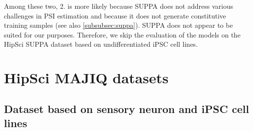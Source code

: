 Among these two, 2. is more likely because SUPPA does not address various challenges in PSI estimation and because it does not generate constitutive training samples (see also \ref{subsubsec:suppa}). SUPPA does not appear to be suited for our purposes. Therefore, we skip the evaluation of the models on the HipSci SUPPA dataset based on undifferentiated iPSC cell lines.





\section{HipSci MAJIQ datasets} \label{subsec:majiq}

\subsection{Dataset based on sensory neuron and iPSC cell lines}\label{sec:hipsci_neuron_majiq}




